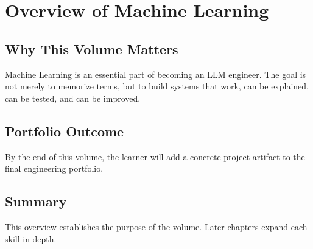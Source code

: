 
\chapter{Overview of Machine Learning}
\label{chap:volume06-overview}



\section{Why This Volume Matters}

Machine Learning is an essential part of becoming an LLM engineer. The goal is not merely to memorize terms, but to build systems that work, can be explained, can be tested, and can be improved.

\section{Portfolio Outcome}

By the end of this volume, the learner will add a concrete project artifact to the final engineering portfolio.

\section{Summary}

This overview establishes the purpose of the volume. Later chapters expand each skill in depth.

